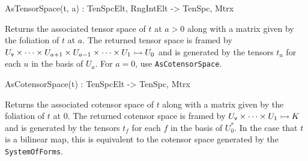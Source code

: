 \begin{intrinsics}
AsTensorSpace(t, a) : TenSpcElt, RngIntElt -> TenSpc, Mtrx
\end{intrinsics}

Returns the associated tensor space of $t$ at $a>0$ along with a matrix given by
the foliation of $t$ at $a$. 
The returned tensor space is framed by 
$U_{\operatorname{\mathtt{v}}}\times \cdots \times U_{a+1}\times U_{a-1}\times \cdots \times U_1\rightarrowtail U_0$
and is generated by the tensors $t_u$ for each $u$ in the basis of $U_a$.
For $a=0$, use \texttt{AsCotensorSpace}.

\begin{intrinsics}
AsCotensorSpace(t) : TenSpcElt -> TenSpc, Mtrx
\end{intrinsics}

Returns the associated cotensor space of $t$ along with a matrix given by the
foliation of $t$ at $0$. The returned cotensor space is framed by
$U_{\operatorname{\mathtt{v}}}\times \cdots \times U_1\rightarrowtail K$ and is generated by the
tensors $t_f$ for each $f$ in the basis of $U_0^*$. In the case that $t$ is a
bilinear map, this is equivalent to the cotensor space generated by the
\texttt{SystemOfForms}.

